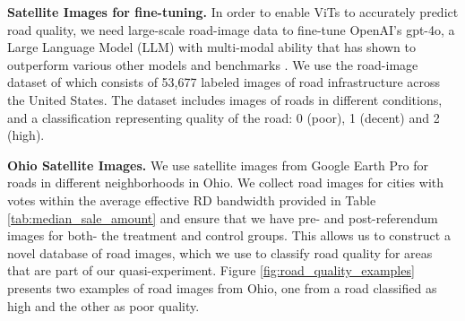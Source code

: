 
{\bf Satellite Images for fine-tuning.} In order to enable ViTs to accurately predict road quality, we need large-scale road-image data to fine-tune OpenAI's gpt-4o, a Large Language Model (LLM) with multi-modal ability that has shown to outperform various other models and benchmarks \citep{achiam2023gpt}. We use the road-image dataset of \cite{brewer2021} which consists of 53,677 labeled images of road infrastructure across the United States. The dataset includes images of roads in different conditions, and a classification representing quality of the road: 0 (poor), 1 (decent) and 2 (high). 

{\bf Ohio Satellite Images.} We use satellite images from Google Earth Pro for roads in different neighborhoods in Ohio. We collect road images for cities with votes within the average effective RD bandwidth provided in Table \ref{tab:median_sale_amount} and ensure that we have pre- and post-referendum images for both- the treatment and control groups. This allows us to construct a novel database of road images, which we use to classify road quality for areas that are part of our quasi-experiment. Figure \ref{fig:road_quality_examples} presents two examples of road images from Ohio, one from a road classified as high and the other as poor quality.

